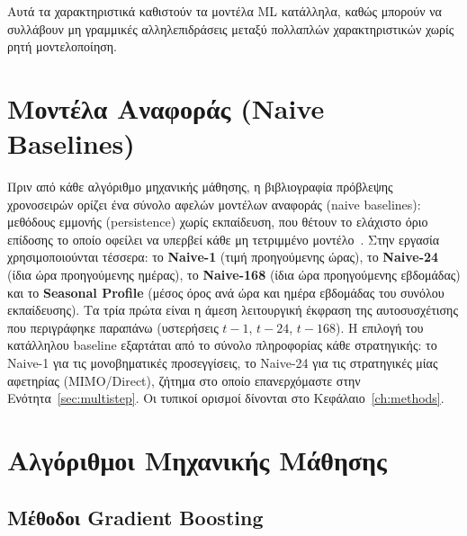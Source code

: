 Αυτά τα χαρακτηριστικά καθιστούν τα μοντέλα ML
κατάλληλα, καθώς μπορούν να συλλάβουν
μη γραμμικές αλληλεπιδράσεις μεταξύ πολλαπλών
χαρακτηριστικών χωρίς ρητή μοντελοποίηση.


\section{Μοντέλα Αναφοράς (Naive Baselines)}
\label{sec:baselines_review}

Πριν από κάθε αλγόριθμο μηχανικής μάθησης, η βιβλιογραφία πρόβλεψης χρονοσειρών ορίζει
ένα σύνολο αφελών μοντέλων αναφοράς (naive baselines): μεθόδους εμμονής (persistence)
χωρίς εκπαίδευση, που θέτουν το ελάχιστο όριο επίδοσης το οποίο οφείλει να υπερβεί κάθε
μη τετριμμένο μοντέλο~\cite{lago2021}. Στην εργασία χρησιμοποιούνται τέσσερα: το
\textbf{Naive-1} (τιμή προηγούμενης ώρας), το \textbf{Naive-24} (ίδια ώρα προηγούμενης
ημέρας), το \textbf{Naive-168} (ίδια ώρα προηγούμενης εβδομάδας) και το \textbf{Seasonal
Profile} (μέσος όρος ανά ώρα και ημέρα εβδομάδας του συνόλου εκπαίδευσης). Τα τρία πρώτα
είναι η άμεση λειτουργική έκφραση της αυτοσυσχέτισης που περιγράφηκε παραπάνω (υστερήσεις
$t-1$, $t-24$, $t-168$). Η επιλογή του κατάλληλου baseline εξαρτάται από το σύνολο
πληροφορίας κάθε στρατηγικής: το Naive-1 για τις μονοβηματικές προσεγγίσεις, το Naive-24
για τις στρατηγικές μίας αφετηρίας (MIMO/Direct), ζήτημα στο οποίο επανερχόμαστε στην
Ενότητα~\ref{sec:multistep}. Οι τυπικοί ορισμοί δίνονται στο
Κεφάλαιο~\ref{ch:methods}.


\section{Αλγόριθμοι Μηχανικής Μάθησης}
\label{sec:ml_algorithms}

\subsection{Μέθοδοι Gradient Boosting}
\label{subsec:gbt}

